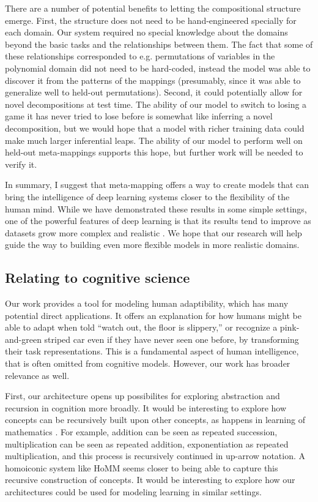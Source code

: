 There are a number of potential benefits to letting the compositional structure emerge. First, the structure does not need to be hand-engineered specially for each domain. Our system required no special knowledge about the domains beyond the basic tasks and the relationships between them. The fact that some of these relationships corresponded to e.g. permutations of variables in the polynomial domain did not need to be hard-coded, instead the model was able to discover it from the patterns of the mappings (presumably, since it was able to generalize well to held-out permutations). Second, it could potentially allow for novel decompositions at test time. The ability of our model to switch to losing a game it has never tried to lose before is somewhat like inferring a novel decomposition, but we would hope that a model with richer training data could make much larger inferential leaps. The ability of our model to perform well on held-out meta-mappings supports this hope, but further work will be needed to verify it. \par

In summary, I suggest that meta-mapping offers a way to create models that can bring the intelligence of deep learning systems closer to the flexibility of the human mind. While we have demonstrated these results in some simple settings, one of the powerful features of deep learning is that its results tend to improve as datasets grow more complex and realistic \citep{Hill2019a,Radford2019}. We hope that our research will help guide the way to building even more flexible models in more realistic domains.  \par

\subsection{Relating to cognitive science}

Our work provides a tool for modeling human adaptibility, which has many potential direct applications. It offers an explanation for how humans might be able to adapt when told ``watch out, the floor is slippery,'' or recognize a pink-and-green striped car even if they have never seen one before, by transforming their task representations. This is a fundamental aspect of human intelligence, that is often omitted from cognitive models. However, our work has broader relevance as well. \par 

First, our architecture opens up possibilites for exploring abstraction and recursion in cognition more broadly. It would be interesting to explore how concepts can be recursively built upon other concepts, as happens in learning of mathematics \citep{Wilensky1991, Hazzan1999, Lampinen2017b}. For example, addition can be seen as repeated succession, multiplication can be seen as repeated addition, exponentiation as repeated multiplication, and this process is recursively continued in up-arrow notation. A homoiconic system like HoMM seems closer to being able to capture this recursive construction of concepts. It would be interesting to explore how our architectures could be used for modeling learning in similar settings. \par 


